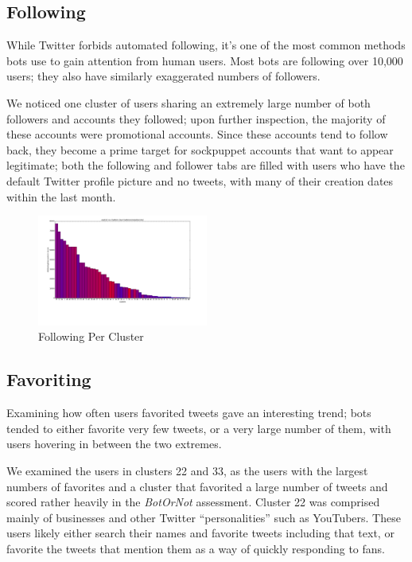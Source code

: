 \documentclass{sig-alternate-05-2015}
\begin{document}
\subsection{Following}

While Twitter forbids automated following, it's one of the most common methods bots use to gain attention from human users. Most bots are following over 10,000 users; they also have similarly exaggerated numbers of followers.

We noticed one cluster of users sharing an extremely large number of both followers and accounts they followed; upon further inspection, the majority of these accounts were promotional accounts. Since these accounts tend to follow back, they become a prime target for sockpuppet accounts that want to appear legitimate; both the following and follower tabs are filled with users who have the default Twitter profile picture and no tweets, with many of their creation dates within the last month.

\begin{figure}[h!]
	\caption{Following Per Cluster}
	\centering
		\includegraphics[width=0.5\textwidth]{imgs/following}
\end{figure}

\subsection{Favoriting}

Examining how often users favorited tweets gave an interesting trend; bots tended to either favorite very few tweets, or a very large number of them, with users hovering in between the two extremes.

We examined the users in clusters 22 and 33, as the users with the largest numbers of favorites and a cluster that favorited a large number of tweets and scored rather heavily in the \emph{BotOrNot} assessment. Cluster 22 was comprised mainly of businesses and other Twitter ``personalities'' such as YouTubers. These users likely either search their names and favorite tweets including that text, or favorite the tweets that mention them as a way of quickly responding to fans.
\end{document}
